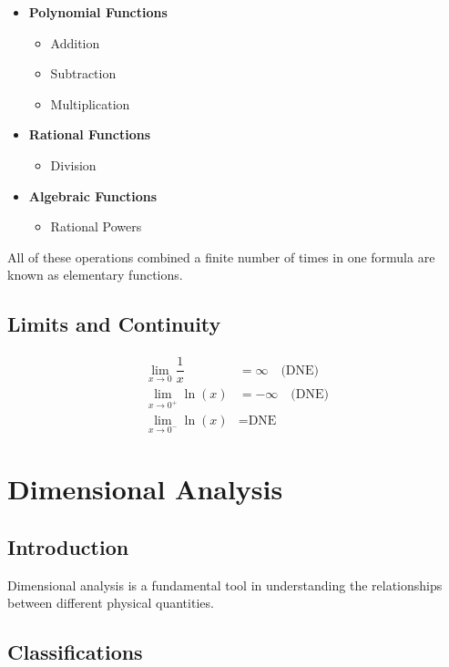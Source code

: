 \documentclass[a4paper,12pt,openany]{book}
\begin{document}
\begin{itemize}
    \item \textbf{Polynomial Functions}
    \begin{itemize}
        \item Addition
        \item Subtraction
        \item Multiplication
    \end{itemize}
    \item \textbf{Rational Functions}
    \begin{itemize}
        \item Division
    \end{itemize}
    \item \textbf{Algebraic Functions}
    \begin{itemize}
        \item Rational Powers
    \end{itemize}
\end{itemize}
All of these operations combined a finite number of times in one formula are known as elementary functions.

\section{Limits and Continuity}

\begin{align*}
    \lim_{x \to 0} \dfrac{1}{x} &= \infty \quad \text{(DNE)} \\
    \lim_{x \to 0^+} \ln(x) &= -\infty \quad \text{(DNE)} \\
    \lim_{x \to 0^-} \ln(x) &= \text{DNE}
\end{align*}

\chapter{Dimensional Analysis}

\section{Introduction}
Dimensional analysis is a fundamental tool in understanding the relationships between different physical quantities.

\section{Classifications}
\end{document}
